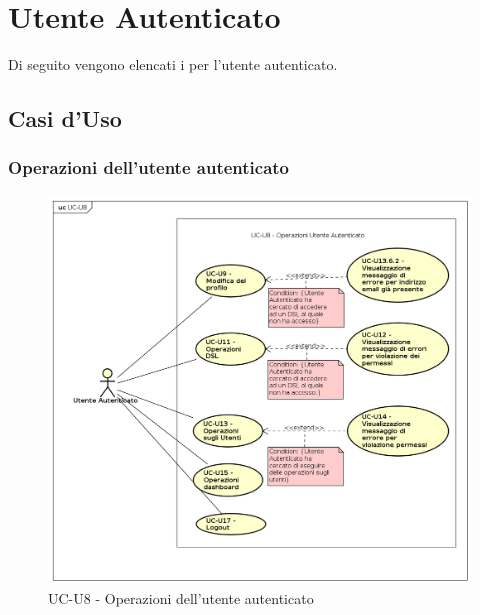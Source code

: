 \section{Utente Autenticato}

Di seguito vengono elencati i  per l'utente autenticato.
\subsection{Casi d'Uso}

\subsubsection{Operazioni dell'utente autenticato}

    \begin{figure}[H]
      \begin{center}
        \includegraphics[width=12cm]{res/img/UCUtenti/UCUtenteA/UC-U8.png}
      \caption{UC-U8 - Operazioni dell'utente autenticato}
      \end{center} 
    \end{figure}    
    
